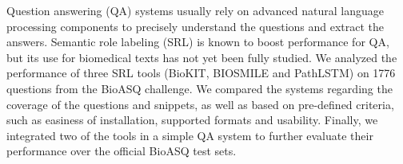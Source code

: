 Question answering (QA) systems usually rely on advanced natural language processing components to precisely understand the questions and extract the answers. Semantic role labeling (SRL) is known to boost performance for QA, but its use for biomedical texts has not yet been fully studied. We analyzed the performance of three SRL tools (BioKIT, BIOSMILE and PathLSTM) on 1776 questions from the BioASQ challenge. We compared the systems regarding the coverage of the questions and snippets, as well as based on pre-defined criteria, such as easiness of installation, supported formats and usability. Finally, we integrated two of the tools in a simple QA system to further evaluate their performance over the official BioASQ test sets.
